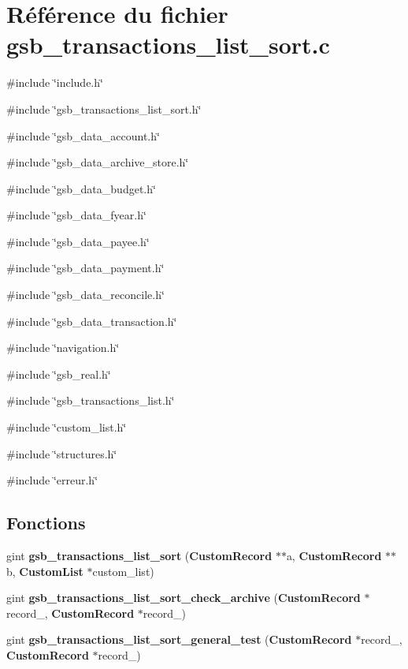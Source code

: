 \section{Référence du fichier gsb\_\-transactions\_\-list\_\-sort.c}
\label{gsb__transactions__list__sort_8c}
{\ttfamily \#include \char`\"{}include.h\char`\"{}}\par
{\ttfamily \#include \char`\"{}gsb\_\-transactions\_\-list\_\-sort.h\char`\"{}}\par
{\ttfamily \#include \char`\"{}gsb\_\-data\_\-account.h\char`\"{}}\par
{\ttfamily \#include \char`\"{}gsb\_\-data\_\-archive\_\-store.h\char`\"{}}\par
{\ttfamily \#include \char`\"{}gsb\_\-data\_\-budget.h\char`\"{}}\par
{\ttfamily \#include \char`\"{}gsb\_\-data\_\-fyear.h\char`\"{}}\par
{\ttfamily \#include \char`\"{}gsb\_\-data\_\-payee.h\char`\"{}}\par
{\ttfamily \#include \char`\"{}gsb\_\-data\_\-payment.h\char`\"{}}\par
{\ttfamily \#include \char`\"{}gsb\_\-data\_\-reconcile.h\char`\"{}}\par
{\ttfamily \#include \char`\"{}gsb\_\-data\_\-transaction.h\char`\"{}}\par
{\ttfamily \#include \char`\"{}navigation.h\char`\"{}}\par
{\ttfamily \#include \char`\"{}gsb\_\-real.h\char`\"{}}\par
{\ttfamily \#include \char`\"{}gsb\_\-transactions\_\-list.h\char`\"{}}\par
{\ttfamily \#include \char`\"{}custom\_\-list.h\char`\"{}}\par
{\ttfamily \#include \char`\"{}structures.h\char`\"{}}\par
{\ttfamily \#include \char`\"{}erreur.h\char`\"{}}\par
\subsection*{Fonctions}
\begin{DoxyCompactItemize}
\item 
gint {\bf gsb\_\-transactions\_\-list\_\-sort} ({\bf CustomRecord} $\ast$$\ast$a, {\bf CustomRecord} $\ast$$\ast$b, {\bf CustomList} $\ast$custom\_\-list)
\item 
gint {\bf gsb\_\-transactions\_\-list\_\-sort\_\-check\_\-archive} ({\bf CustomRecord} $\ast$record\_, {\bf CustomRecord} $\ast$record\_)
\item 
gint {\bf gsb\_\-transactions\_\-list\_\-sort\_\-general\_\-test} ({\bf CustomRecord} $\ast$record\_, {\bf CustomRecord} $\ast$record\_)
\end{DoxyCompactItemize}


